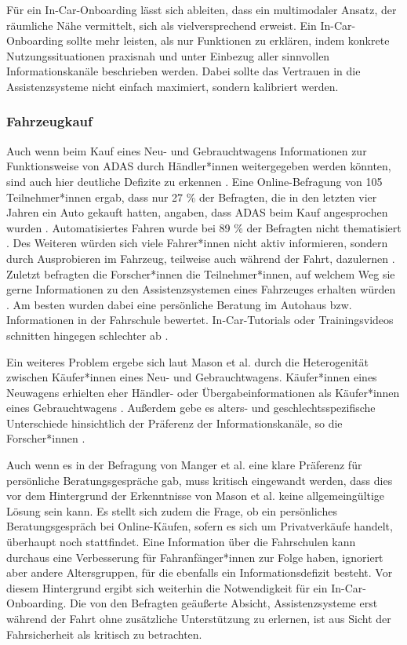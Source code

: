 Für ein In-Car-Onboarding lässt sich ableiten, dass ein multimodaler Ansatz, der räumliche Nähe vermittelt, sich als vielversprechend erweist. Ein In-Car-Onboarding sollte mehr leisten, als nur Funktionen zu erklären, indem konkrete Nutzungssituationen praxisnah und unter Einbezug aller sinnvollen Informationskanäle beschrieben werden. Dabei sollte das Vertrauen in die Assistenzsysteme nicht einfach maximiert, sondern kalibriert werden.

\subsubsection{Fahrzeugkauf}
\label{subsubsec:fahrzeugkauf}
Auch wenn beim Kauf eines Neu- und Gebrauchtwagens Informationen zur Funktionsweise von ADAS durch Händler*innen weitergegeben werden könnten, sind auch hier deutliche Defizite zu erkennen \cite{manger2024explanation}. Eine Online-Befragung von 105 Teilnehmer*innen ergab, dass nur 27 \% der Befragten, die in den letzten vier Jahren ein Auto gekauft hatten, angaben, dass ADAS beim Kauf angesprochen wurden \cite{manger2024explanation}. Automatisiertes Fahren wurde bei 89 \% der Befragten nicht thematisiert \cite{manger2024explanation}. Des Weiteren würden sich viele Fahrer*innen nicht aktiv informieren, sondern durch Ausprobieren im Fahrzeug, teilweise auch während der Fahrt, dazulernen \cite{manger2024explanation}. Zuletzt befragten die Forscher*innen die Teilnehmer*innen, auf welchem Weg sie gerne Informationen zu den Assistenzsystemen eines Fahrzeuges erhalten würden \cite{manger2024explanation}. Am besten wurden dabei eine persönliche Beratung im Autohaus bzw. Informationen in der Fahrschule bewertet. In-Car-Tutorials oder Trainingsvideos schnitten hingegen schlechter ab \cite{manger2024explanation}.

Ein weiteres Problem ergebe sich laut Mason et al. \cite{mason2024developing} durch die Heterogenität zwischen Käufer*innen eines Neu- und Gebrauchtwagens. Käufer*innen eines Neuwagens erhielten eher Händler- oder Übergabeinformationen als Käufer*innen eines Gebrauchtwagens \cite{mason2024developing}. Außerdem gebe es alters- und geschlechtsspezifische Unterschiede hinsichtlich der Präferenz der Informationskanäle, so die Forscher*innen \cite{mason2024developing}. 

Auch wenn es in der Befragung von Manger et al. \cite{manger2024explanation} eine klare Präferenz für persönliche Beratungsgespräche gab, muss kritisch eingewandt werden, dass dies vor dem Hintergrund der Erkenntnisse von Mason et al. \cite{mason2024developing} keine allgemeingültige Lösung sein kann. Es stellt sich zudem die Frage, ob ein persönliches Beratungsgespräch bei Online-Käufen, sofern es sich um Privatverkäufe handelt, überhaupt noch stattfindet. Eine Information über die Fahrschulen kann durchaus eine Verbesserung für Fahranfänger*innen zur Folge haben, ignoriert aber andere Altersgruppen, für die ebenfalls ein Informationsdefizit besteht. Vor diesem Hintergrund ergibt sich weiterhin die Notwendigkeit für ein In-Car-Onboarding. Die von den Befragten \cite{manger2024explanation} geäußerte Absicht, Assistenzsysteme erst während der Fahrt ohne zusätzliche Unterstützung zu erlernen, ist aus Sicht der Fahrsicherheit als kritisch zu betrachten.

